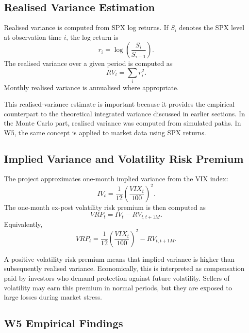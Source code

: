 \subsection{Realised Variance Estimation}

Realised variance is computed from SPX log returns. If \(S_i\) denotes the SPX level at observation time \(i\), the log return is
\begin{equation}
r_i
=
\log\left(
\frac{S_i}{S_{i-1}}
\right).
\end{equation}
The realised variance over a given period is computed as
\begin{equation}
RV_t
=
\sum_i r_i^2.
\end{equation}
Monthly realised variance is annualised where appropriate.

This realised-variance estimate is important because it provides the empirical counterpart to the theoretical integrated variance discussed in earlier sections. In the Monte Carlo part, realised variance was computed from simulated paths. In W5, the same concept is applied to market data using SPX returns.

\subsection{Implied Variance and Volatility Risk Premium}

The project approximates one-month implied variance from the VIX index:
\begin{equation}
IV_t
=
\frac{1}{12}
\left(
\frac{VIX_t}{100}
\right)^2.
\end{equation}
The one-month ex-post volatility risk premium is then computed as
\begin{equation}
VRP_t
=
IV_t
-
RV_{t,t+1M}.
\end{equation}
Equivalently,
\begin{equation}
VRP_t
=
\frac{1}{12}
\left(
\frac{VIX_t}{100}
\right)^2
-
RV_{t,t+1M}.
\end{equation}

A positive volatility risk premium means that implied variance is higher than subsequently realised variance. Economically, this is interpreted as compensation paid by investors who demand protection against future volatility. Sellers of volatility may earn this premium in normal periods, but they are exposed to large losses during market stress.

\subsection{W5 Empirical Findings}

